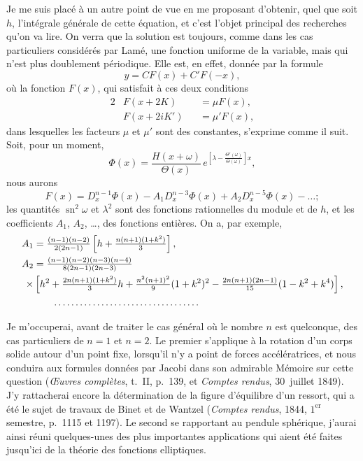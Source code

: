 \documentclass[11pt,leqno,oneside,letterpaper]{book}[2005/09/16]
\DeclareMathOperator{\sn}{sn}
\newcommand{\dotfillgather}{\makebox[15em]{\dotfill}}
\begin{document}
Je me suis plac\'e \`a un autre point de vue en me proposant d'obtenir,
quel que soit $h$, l'int\'egrale g\'en\'erale de cette \'equation, et c'est l'objet principal
des recherches qu'on va lire. On verra que la solution est toujours,
comme dans les cas particuliers consid\'er\'es par Lam\'e, une fonction uniforme
de la variable, mais qui n'est plus doublement p\'eriodique. Elle est,
en effet, donn\'ee par la formule
\[
y = C F(x) + C' F(-x),
\]
o\`u
la fonction $F(x)$, qui satisfait \`a ces deux conditions
\begin{alignat*}{2}
&F(x + 2 K) &&= \mu F(x),\\
&F(x + 2iK') &&= \mu' F(x),
\end{alignat*}
dans lesquelles les facteurs $\mu$ et $\mu'$ sont des constantes, s'exprime comme
il suit. Soit, pour un moment,
\[
\Phi(x) = \frac{H(x+\omega)}{\Theta(x)}\,
e^{\left[\lambda-\frac{\Theta'(\omega)}{\Theta(\omega)} \right] x} ,
\]
nous aurons
\[
F(x) = D^{n-1}_{x} \Phi(x)
- A_1 D^{n-3}_{x} \Phi(x)
+ A_2 D^{n-5}_{x} \Phi(x)
- \ldots ;
\]
les quantit\'es $\sn^2 \omega$ et $\lambda^2$ sont des fonctions rationnelles du module et de
$h$, et les coefficients $A_1$, $A_2$, \ldots, des fonctions enti\`eres. On a, par exemple,
\begin{align*}
A_1 &= \tfrac{(n-1)(n-2)}{2(2n-1)}
\left[ h + \tfrac{n(n+1)(1+k^2)}{3} \right], \\
A_2 &= \tfrac{ (n-1) (n-2) (n-3) (n-4) }{ 8 (2n-1) (2n-3) } \\
\times& \left[ h^2 + \tfrac{2n (n+1) (1+k^2)}{3} h
 + \tfrac{n^2 (n+1)^2}{9} (1+k^2)^2
  - \tfrac{2n (n+1) (2n-1)}{15} (1-k^2+k^4) \right],\\
&\qquad\dotfillgather
\end{align*}

Je m'occuperai, avant de traiter le cas g\'en\'eral o\`u le nombre $n$ est
quelconque, des cas particuliers de $n=1$ et $n=2$. Le premier s'applique
\`a la rotation d'un corps solide autour d'un point fixe, lorsqu'il n'y a point
de forces acc\'el\'eratrices, et nous conduira aux formules donn\'ees par Jacobi
dans son admirable M\'emoire sur cette question (\textit{{\OE}uvres compl\`etes}, t.~II,
p.~139, et \textit{Comptes rendus}, 30~juillet 1849). J'y rattacherai encore la
d\'etermination de la figure d'\'equilibre d'un ressort, qui a \'et\'e le sujet de travaux
de Binet et de Wantzel (\textit{Comptes rendus}, 1844, $1^{\mathrm{er}}$ semestre, p.~1115 et 1197).
Le second se rapportant au pendule sph\'erique, j'aurai ainsi r\'euni
quelques-unes des plus importantes applications qui aient \'et\'e faites jusqu'ici
de la th\'eorie des fonctions elliptiques.
\end{document}
